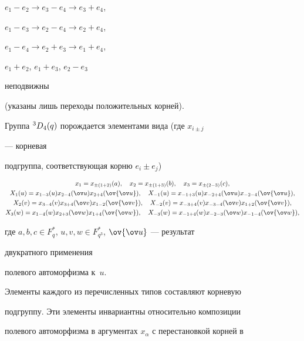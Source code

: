 $e_1-e_2\to e_3-e_4\to e_3+e_4$, 


$e_1-e_3\to e_2-e_4\to e_2+e_4$, 


$e_1-e_4\to e_2+e_3\to e_1+e_4$, 


$e_1+e_2$, $e_1+e_3$, $e_2-e_3$ 


неподвижны 


(указаны лишь переходы положительных корней). 


 


Группа ${}^3D_4(q)$ порождается элементами вида (где $x_{i\pm j}$ 


--- корневая  


подгруппа, соответствующая корню $e_i\pm e_j$)


\begin{gather*} 


x_1=x_{\pm(1+2)}(a),\quad x_2=x_{\pm(1+3)}(b),\quad 


x_3=x_{\pm(2-3)}(c), \\ 


%


X_1(u)=x_{1-3}(u)x_{2-4}(\ov u)x_{2+4}(\ov{\ov u}), \quad 


X_{-1}(u)=x_{-1+3}(u)x_{-2+4}(\ov u)x_{-2-4}(\ov{\ov u}),\\ 


%


X_2(v)=x_{3-4}(v)x_{3+4}(\ov v)x_{1-2}(\ov{\ov v}), \quad 


X_{-2}(v)=x_{-3+4}(v)x_{-3-4}(\ov v)x_{1+2}(\ov{\ov v}),\\ 


%


X_3(w)=x_{1-4}(w)x_{2+3}(\ov w)x_{1+4}(\ov{\ov w}),\quad 


X_{-3}(w)=x_{-1+4}(w)x_{-2-3}(\ov w)x_{-1-4}(\ov{\ov w}), 


\end{gather*} 


где $a,b,c\in F^*_q$, $u,v,w\in F^*_{q^3}$, $\ov{\ov u}$ --- результат 


двукратного применения 


полевого автоморфизма к~$u$. 


 


Элементы каждого из перечисленных типов составляют корневую  


подгруппу. Эти элементы инвариантны относительно композиции  


полевого автоморфизма в аргументах $x_\alpha$ с перестановкой корней в 


